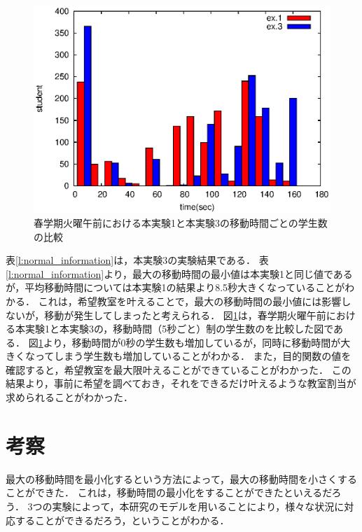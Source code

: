 \documentclass[12pt, a4paper, fleqn]{jreport}
\begin{document}
\begin{figure}[thpb]
 \begin{center}
 \hspace{5mm} 
\includegraphics[bb=0 0 390 248,clip,scale=1.0]{otukarehist.eps}
 \hspace{-10mm} 
\vspace{-5mm}
\caption{春学期火曜午前における本実験1と本実験3の移動時間ごとの学生数の比較}                              
  \label{hikaku1-3}
 \end{center}
\end{figure}

表\ref{l:normal_information}は，本実験3の実験結果である．
表\ref{l:normal_information}より，最大の移動時間の最小値は本実験1と同じ値であるが，平均移動時間については本実験1の結果より8.5秒大きくなっていることがわかる．
これは，希望教室を叶えることで，最大の移動時間の最小値には影響しないが，移動が発生してしまったと考えられる．
図\ref{hikaku1-3}は，春学期火曜午前における本実験1と本実験3の，移動時間（5秒ごと）制の学生数のを比較した図である．
図\ref{hikaku1-3}より，移動時間が0秒の学生数も増加しているが，同時に移動時間が大きくなってしまう学生数も増加していることがわかる．
また，目的関数の値を確認すると，希望教室を最大限叶えることができていることがわかった．
この結果より，事前に希望を調べておき，それをできるだけ叶えるような教室割当が求められることがわかった．



\section{考察}
最大の移動時間を最小化するという方法によって，最大の移動時間を小さくすることができた．
これは，移動時間の最小化をすることができたといえるだろう．
3つの実験によって，本研究のモデルを用いることにより，様々な状況に対応することができるだろう，ということがわかる．
\fi
\end{document}
